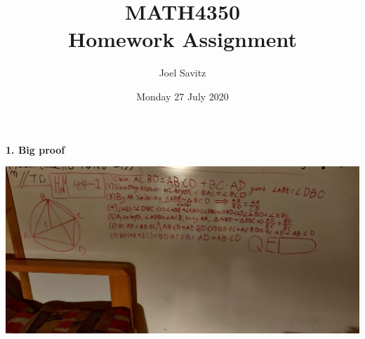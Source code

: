\documentclass[12pt]{article}
\title{MATH4350 \\ Homework Assignment}
\author{Joel Savitz}
\date{Monday 27 July 2020}
\begin{document}
\maketitle

\textbf{1. Big proof}
\medskip

\includegraphics[scale=0.08]{1.jpg}
\end{document}
